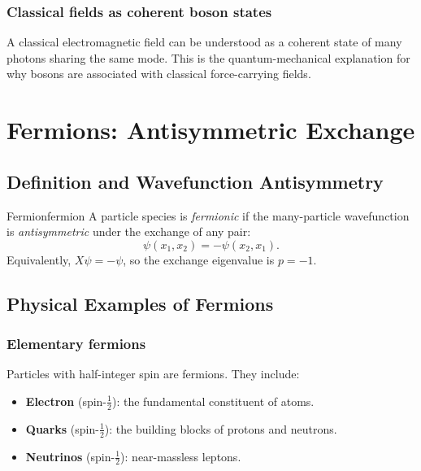 \documentclass[11pt,a4paper]{article}
\begin{document}
\subsubsection{Classical fields as coherent boson states}

A classical electromagnetic field can be understood as a coherent state of
many photons sharing the same mode.  This is the quantum-mechanical explanation
for why bosons are associated with classical force-carrying fields.

\section{Fermions: Antisymmetric Exchange}

\subsection{Definition and Wavefunction Antisymmetry}

\begin{defn}{Fermion}{fermion}
  A particle species is \emph{fermionic} if the many-particle wavefunction
  is \emph{antisymmetric} under the exchange of any pair:
  \[
    \psi(x_1, x_2) = -\psi(x_2, x_1).
  \]
  Equivalently, $X\psi = -\psi$, so the exchange eigenvalue is $p = -1$.
\end{defn}

\subsection{Physical Examples of Fermions}

\subsubsection{Elementary fermions}

Particles with half-integer spin are fermions.  They include:
\begin{itemize}
  \item \textbf{Electron} (spin-$\tfrac{1}{2}$): the fundamental constituent of atoms.
  \item \textbf{Quarks} (spin-$\tfrac{1}{2}$): the building blocks of protons and neutrons.
  \item \textbf{Neutrinos} (spin-$\tfrac{1}{2}$): near-massless leptons.
\end{itemize}
\end{document}
